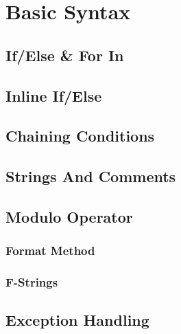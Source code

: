 \section{Basic Syntax}

  \subsection{If/Else \& For In}

  \subsection{Inline If/Else}

  \subsection{Chaining Conditions}

  \subsection{Strings And Comments}

    \subsection{Modulo Operator}

    \subsubsection{Format Method}

    \subsubsection{F-Strings}
  
  \subsection{Exception Handling}